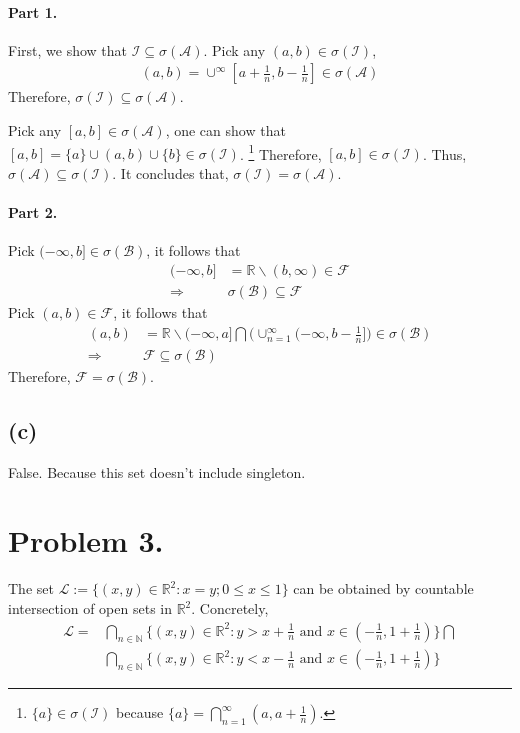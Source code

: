 \documentclass[11pt]{article}
\theoremstyle{definition}
\theoremstyle{boldtitle} %
\numberwithin{equation}{section}
\numberwithin{figure}{section}
\numberwithin{table}{section}
\begin{document}
\paragraph{Part 1.}
First, we show that $\mathcal{I} \subseteq \sigma(\mathcal{A})$.
Pick any $(a, b) \in \sigma(\mathcal{I})$,
\begin{align*}
  (a, b) = \cup^\infty [a+\frac{1}{n}, b-\frac{1}{n}] \in \sigma(\mathcal{A})
\end{align*}
Therefore, $\sigma(\mathcal{I}) \subseteq \sigma(\mathcal{A})$.

Pick any $[a, b] \in \sigma(\mathcal{A})$,  
one can show that 
$[a, b] = \{a\} \cup (a, b) \cup \{b\} \in \sigma(\mathcal{I})$.%
\footnote{
  $\{a\} \in \sigma(\mathcal{I})$ because $\{a\} = \bigcap_{n=1}^\infty (a, a+\frac{1}{n})$.
}
Therefore,
$[a, b] \in \sigma(\mathcal{I})$. 
Thus, $\sigma(\mathcal{A}) \subseteq \sigma(\mathcal{I})$.
It concludes that, $\sigma(\mathcal{I}) = \sigma(\mathcal{A})$. 

\paragraph{Part 2.}
Pick $(-\infty, b] \in \sigma (\mathcal{B})$, it follows that 
\begin{align*}
  (-\infty, b] & = \mathbb{R}\backslash (b, \infty) \in \mathcal{F} \\
\Rightarrow & \sigma (\mathcal{B}) \subseteq \mathcal{F}
\end{align*}
%
Pick $(a, b) \in \mathcal{F}$, it follows that 
\begin{align*}
  (a, b) & = \mathbb{R}\backslash (-\infty, a] \bigcap \bigg( \cup_{n=1}^\infty  (-\infty, b - \frac{1}{n}] \bigg) \in \sigma(\mathcal{B}) \\
\Rightarrow & \mathcal{F} \subseteq \sigma (\mathcal{B}) 
\end{align*}
Therefore, $ \mathcal{F} = \sigma (\mathcal{B}) $.

\subsection*{(c)}
False. Because this set doesn't include singleton.


\section*{Problem 3.}
The set $\mathcal{L} := \{(x, y) \in \mathbb{R}^2: x = y; 0 \leq x \leq 1 \}$ can be obtained by countable intersection of open sets in $\mathbb{R}^2$.
Concretely, 
\begin{align*}
\mathcal{L} = & \bigcap_{n \in \mathbb{N}} \{ (x, y) \in \mathbb{R}^2: y > x + \frac{1}{n} \text{ and } x \in (-\frac{1}{n}, 1 + \frac{1}{n})\} \bigcap \\ 
  & \bigcap_{n \in \mathbb{N}} \{ (x, y) \in \mathbb{R}^2: y < x - \frac{1}{n} \text{ and } x \in (-\frac{1}{n}, 1 + \frac{1}{n})\} 
\end{align*}
\end{document}
